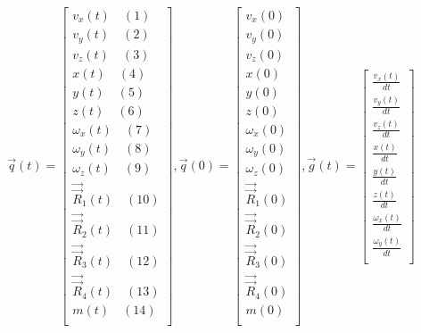 \documentclass{article}
\begin{document}
\begin{equation}
\vec{q}(t) = 
\begin{bmatrix}
    v_x(t) \quad(1)\\
    v_y(t) \quad(2)\\
    v_z(t) \quad(3)\\
    x(t) \quad(4)\\
    y(t) \quad(5)\\
    z(t) \quad(6)\\
    \omega_x(t) \quad(7)\\
    \omega_y(t) \quad(8)\\
    \omega_z(t) \quad(9)\\
    \vec{\vec{R}}_1(t) \quad(10)\\
    \vec{\vec{R}}_2(t) \quad(11)\\
    \vec{\vec{R}}_3(t) \quad(12)\\
    \vec{\vec{R}}_4(t) \quad(13)\\
    m(t) \quad(14)\\
\end{bmatrix}
, 
\vec{q}(0) = 
\begin{bmatrix}
    v_x(0)  \\
    v_y(0)  \\
    v_z(0)  \\
    x(0) \\
    y(0) \\
    z(0) \\
    \omega_x(0) \\
    \omega_y(0) \\
    \omega_z(0) \\
    \vec{\vec{R}}_1(0) \\
    \vec{\vec{R}}_2(0) \\
    \vec{\vec{R}}_3(0) \\
    \vec{\vec{R}}_4(0) \\
    m(0) \\
\end{bmatrix}
,
    \vec{g}(t) =
\begin{bmatrix}
    \frac{v_x(t)}{dt} \\
    \frac{v_y(t)}{dt} \\
    \frac{v_z(t)}{dt} \\
    \frac{x(t)}{dt} \\
    \frac{y(t)}{dt} \\
    \frac{z(t)}{dt} \\
    \frac{\omega_x(t)}{dt} \\
    \frac{\omega_y(t)}{dt} \\

\end{bmatrix}
\end{equation}
\end{document}
